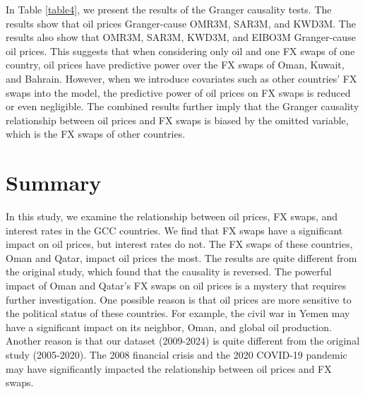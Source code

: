 \documentclass[12pt]{article}
\begin{document}
\begin{sloppypar}
In Table \ref{table4}, we present the results of the Granger causality tests. The results show that oil prices Granger-cause OMR3M, SAR3M, and KWD3M. The results also show that OMR3M, SAR3M, KWD3M, and EIBO3M Granger-cause oil prices. This suggests that when considering only oil and one FX swaps of one country, oil prices have predictive power over the FX swaps of Oman, Kuwait, and Bahrain. However, when we introduce covariates such as other countries' FX swaps into the model, the predictive power of oil prices on FX swaps is reduced or even negligible. The combined results further imply that the Granger causality relationship between oil prices and FX swaps is biased by the omitted variable, which is the FX swaps of other countries.
\begin{table}[ht]
    \centering
    \caption{Granger Causality Test Results}
    \label{table4}
\end{table}
\newpage
\section{Summary}
In this study, we examine the relationship between oil prices, FX swaps, and interest rates in the GCC countries. We find that FX swaps have a significant impact on oil prices, but interest rates do not. The FX swaps of these countries, Oman and Qatar, impact oil prices the most. The results are quite different from the original study, which found that the causality is reversed. The powerful impact of Oman and Qatar's FX swaps on oil prices is a mystery that requires further investigation. One possible reason is that oil prices are more sensitive to the political status of these countries. For example, the civil war in Yemen may have a significant impact on its neighbor, Oman, and global oil production. Another reason is that our dataset (2009-2024) is quite different from the original study (2005-2020). The 2008 financial crisis and the 2020 COVID-19 pandemic may have significantly impacted the relationship between oil prices and FX swaps.



\end{sloppypar}
\end{document}
